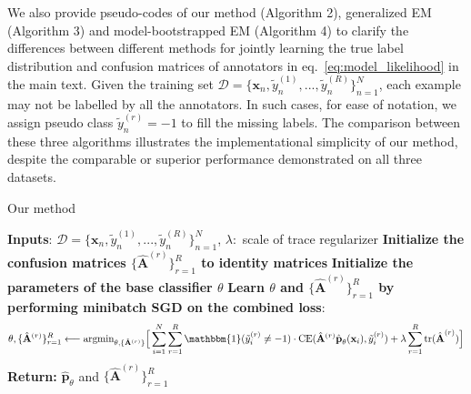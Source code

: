 We also provide pseudo-codes of our method (Algorithm 2), generalized EM \cite{raykar2009supervised} (Algorithm 3) and model-bootstrapped EM \cite{khetan2017learning} (Algorithm 4) to clarify the differences between different methods for jointly learning the true label distribution and confusion matrices of annotators in eq.~\eqref{eq:model_likelihood} in the main text. Given the training set $\mathcal{D} = \{\textbf{x}_n, \tilde{y}^{(1)}_{n},...,\tilde{y}^{(R)}_{n}\}_{n=1}^{N}$, each example may not be labelled by all the annotators. In such cases, for ease of notation, we assign pseudo class $\tilde{y}^{(r)}_{n}=-1$ to fill the missing labels. The comparison between these three algorithms illustrates the implementational simplicity of our method, despite the comparable or superior performance demonstrated on all three datasets. 

\begin{algorithm}
	\caption{Our method}
	\label{alg:ourmethod}
		\small
	\begin{algorithmic}
		\State \textbf{Inputs}: $\mathcal{D} = \{\textbf{x}_n, \tilde{y}^{(1)}_{n},...,\tilde{y}^{(R)}_{n}\}_{n=1}^{N}$,
		$\lambda:$ scale of trace regularizer
		\State \textbf{Initialize the confusion matrices $\{\hat{\mathbf{A}}^{(r)}\}_{r=1}^{R}$ to identity matrices}
		\State \textbf{Initialize the parameters of the base classifier $\theta$}
		\State \textbf{Learn $\theta$ and $\{\hat{\mathbf{A}}^{(r)}\}_{r=1}^{R}$ by performing minibatch SGD on the combined loss}:
		\vspace{-2mm}
		$$\theta, \{\hat{\mathbf{A}}^{(r)}\}_{r=1}^{R} \longleftarrow \text{argmin}_{\theta, \{\hat{\mathbf{A}}^{(r)}\}} \Big{[}\sum_{i=1}^{N}\sum_{r=1}^{R} \mathbbm{1}(\tilde{y}_{i}^{(r)} \neq -1)\cdot \text{CE}(\hat{\mathbf{A}}^{(r)}\hat{\textbf{p}}_{\theta}(\mathbf{x}_i), \tilde{y}^{(r)}_{i})  + \lambda \sum_{r=1}^{R}\text{tr}(\hat{\textbf{A}}^{(r)}) \Big{]}$$ 
		\vspace{-3mm}
		\State \textbf{Return:   } $\hat{\mathbf{p}}_{\theta}$ and $\{\hat{\mathbf{A}}^{(r)}\}_{r=1}^R$
	\end{algorithmic}
\end{algorithm}

